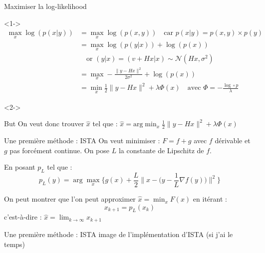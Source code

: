\documentclass[11pt]{beamer}
\begin{document}
\begin{frame}{Maximiser la log-likelihood}
    \begin{visibleenv}<1->
        \begin{align*}
            \max_x \log(p(x|y)) &= \max_x \log(p(x, y)) \quad \text{car } p(x|y) = p(x, y) \times p(y) \\
            &= \max_x \log(p(y|x)) + \log(p(x)) \\
            &\quad \text{or } (y|x) = (v+Hx|x) \sim \mathcal{N}(Hx, \sigma^2) \\
            &= \max_x -\frac{\lVert y-Hx \rVert ^2}{2 \sigma^2} + \log(p(x)) \\
            &= \min_x \frac{1}{2}\lVert y-Hx \rVert ^2 + \lambda \Phi(x) \quad \text{avec } \Phi = -\frac{\log \circ p}{\lambda}
        \end{align*}
    \end{visibleenv}

    \begin{visibleenv}<2->
        \begin{alertblock}{But}
            On veut donc trouver $\hat{x}$ tel que : $\hat{x} = \text{arg} \displaystyle \min_x \frac{1}{2} \lVert y-Hx \rVert ^2 + \lambda \Phi(x)$
        \end{alertblock}
    \end{visibleenv}
\end{frame}

\begin{frame}{Une première méthode : ISTA}
    On veut minimiser : $F = f + g$ avec $f$ dérivable et $g$ pas forcément continue.
    On pose $L$ la constante de Lipschitz de $f$.

    En posant $p_L$ tel que : $$ p_L(y) = \arg \max_x \Bigg\{ g(x) + \frac{L}{2} \Big\lVert x - \Big(y - \frac{1}{L} \nabla f(y)\Big) \Big\rVert ^2 \Bigg\}$$

    On peut montrer que l'on peut approximer $\hat{x} = \displaystyle \min_x F(x)$ en itérant :
    $$x_{k+1} = p_L(x_k)$$
    c'est-à-dire : $\hat{x} = \displaystyle \lim_{k \rightarrow \infty} x_{k+1}$

\end{frame}

\begin{frame}{Une première méthode : ISTA}
    image de l'implémentation d'ISTA (si j'ai le temps)
\end{frame}
\end{document}
